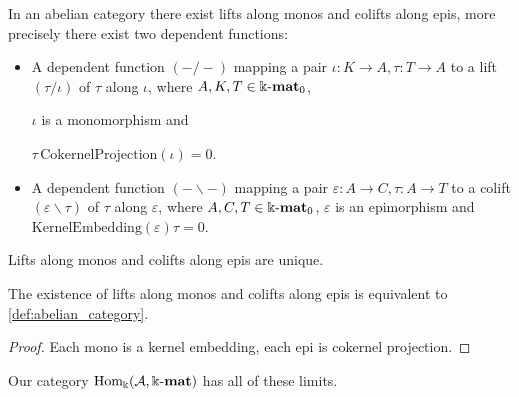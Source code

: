 \begin{example}
In an abelian category there exist lifts along monos and colifts along epis, more precisely there exist two dependent functions:
\begin{itemize}
\item A dependent function $( - / - )$ mapping a pair $\iota : K \rightarrow A, \tau : T \rightarrow A$ to a lift $(\tau / \iota )$ of
$\tau$ along $\iota$, where $A, K, T \in \Bbbk\textnormal{-}\mathbf{mat}_{0}$, 

$\iota$ is a monomorphism and 

$\tau\,\mathrm{CokernelProjection}(\iota) = 0$.

\item A dependent function $( - \backslash - )$ mapping a pair $\varepsilon : A \rightarrow C, \tau : A \rightarrow T$ to a colift
$(\varepsilon \backslash \tau )$ of
$\tau$ along $\varepsilon$, where $A, C, T \in \Bbbk\textnormal{-}\mathbf{mat}_{0}$, $\varepsilon$ is an epimorphism and $\mathrm{KernelEmbedding}(\varepsilon)\tau = 0$.

\end{itemize}
Lifts along monos and colifts along epis are unique.
\end{example}

\begin{remark}
The existence of lifts along monos and colifts along epis is equivalent to \ref{def:abelian_category}.
\end{remark}
\begin{proof}

Each mono is a kernel embedding, each epi is cokernel projection.
\end{proof}


Our category $\mathrm{Hom_{\Bbbk}}(\mathcal{A},\Bbbk\textnormal{-}\mathbf{mat})$ has all of these limits.


